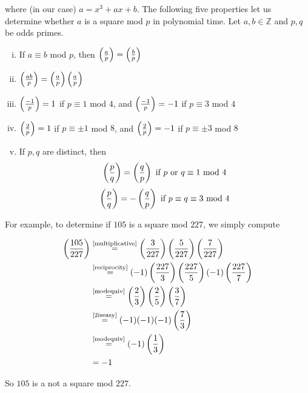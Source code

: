 where (in our case) $a = x^3 + ax + b$. The following five properties let us determine whether $a$ is a square mod $p$ in polynomial time. Let $a,b \in \mathbb{Z}$ and $p,q$ be odds primes.

\begin{enumerate}[(i)]
	\item \label{modequiv} If $a \equiv b$ mod $p$, then $\left(\frac{a}{p}\right) = \left(\frac{b}{p}\right)$
	\item \label{multiplicative} $\left(\frac{ab}{p}\right) = \left(\frac{a}{p}\right) \left(\frac{a}{p}\right) $
	\item \label{1iseasy} $\left(\frac{-1}{p}\right) = 1$ if $p \equiv 1 $ mod $4$, and $\left(\frac{-1}{p}\right) = -1$ if $p \equiv 3 $ mod $4$
	\item \label{2iseasy} $\left(\frac{2}{p}\right) = 1$ if $p \equiv \pm 1 $ mod $8$, and $\left(\frac{2}{p}\right) = -1$ if $p \equiv \pm 3 $ mod $8$
	\item \label{reciprocity} If $p,q$ are distinct, then 
		$$ 
			\left(\frac{p}{q}\right) = \left(\frac{q}{p}\right) \text { if } p \text { or } q \equiv 1 \text{ mod } 4
		$$ 
		$$  
			\left(\frac{p}{q}\right) = - \left(\frac{q}{p}\right) \text { if } p \equiv q \equiv 3 \text{ mod } 4
		$$
\end{enumerate}

For example, to determine if $105$ is a square mod $227$, we simply compute 

\begin{align*}
	\left(\frac{105}{227}\right) &\stackrel{\text{\eqref{multiplicative}}}{=} \left(\frac{3}{227}\right)\left(\frac{5}{227}\right)\left(\frac{7}{227}\right) \\
	&\stackrel{\text{\eqref{reciprocity}}}{=} (-1) \left(\frac{227}{3}\right)\left(\frac{227}{5}\right) (-1) \left(\frac{227}{7}\right) \\
	&\stackrel{\text{\eqref{modequiv}}}{=} \left(\frac{2}{3}\right)\left(\frac{2}{5}\right)\left(\frac{3}{7}\right) \\
	&\stackrel{\text{\eqref{2iseasy}}}{=} (-1)(-1)(-1) \left(\frac{7}{3}\right) \\
	&\stackrel{\text{\eqref{modequiv}}}{=} (-1) \left(\frac{1}{3}\right) \\
	&= -1 
\end{align*}

So $105$ is a not a square mod $227$.

